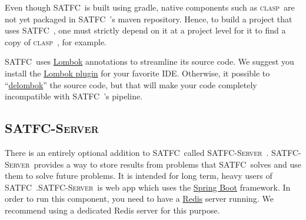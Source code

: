 \documentclass[
10pt, %
letterpaper, %
oneside, %
headinclude,footinclude, %
BCOR5mm, %
needspace, %
]{scrartcl}
\newcommand{\SATFC}{\textsc{SATFC}~}
\newcommand{\SATFCServer}{\textsc{SATFC-Server}~}
\newcommand{\clasp}{\textsc{clasp}~}
\begin{document}
Even though \SATFC is built using gradle, native components such as \clasp are not yet packaged in \SATFC's maven repository. Hence, to build a project that uses \SATFC, one must strictly depend on it at a project level for it to find a copy of \clasp, for example. 

\SATFC uses \href{http://projectlombok.org/}{Lombok} annotations to streamline its source code. We suggest you install the \href{http://projectlombok.org/download.html}{Lombok plugin} for your favorite IDE. Otherwise, it possible to ``\href{http://projectlombok.org/features/delombok.html}{delombok}'' the source code, but that will make your code completely incompatible with \SATFC's pipeline.


%



\subsection{\SATFCServer}

There is an entirely optional addition to \SATFC called \SATFCServer. \SATFCServer provides a way to store results from problems that \SATFC solves and use them to solve future problems. It is intended for long term, heavy users of \SATFC.\SATFCServer is web app which uses the \href{http://projects.spring.io/spring-boot/}{Spring Boot} framework. In order to run this component, you need to have a \href{http://redis.io/}{Redis} server running. We recommend using a dedicated Redis server for this purpose.
\end{document}
